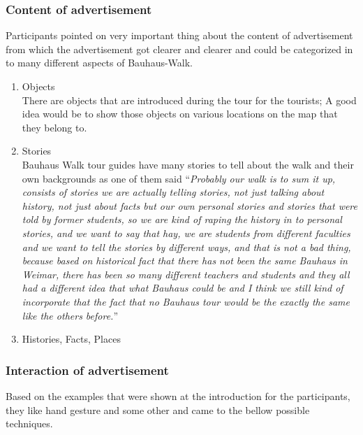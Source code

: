 \subsubsection{Content of advertisement}
Participants pointed on very important thing about the content of advertisement from which the advertisement got clearer and clearer and could be categorized in to many different aspects of Bauhaus-Walk.


\begin {enumerate}

\item	Objects \\
There are objects that are introduced during the tour for the tourists; A good idea would be to show those objects on various locations on the map that they belong to.
\item	Stories \\
Bauhaus Walk tour guides have many stories to tell about the walk and their own backgrounds as one of them said ``\emph{Probably our walk is to sum it up, consists of stories we are actually telling stories, not just talking about history, not just about facts but our own personal stories and stories that were told by former students, so we are kind of raping the history in to personal stories, and we want to say that hay, we are students from different faculties and we want to tell the stories by different ways, and that is not a bad thing, because based on historical fact that there has not been the same Bauhaus in Weimar, there has been so many different teachers and students and they all had a different idea that what Bauhaus could be and I think we still kind of incorporate that the fact that no Bauhaus tour would be the exactly the same like the others before.}''
\item	Histories, Facts, Places

\end{enumerate}

\subsubsection{Interaction of advertisement}
Based on the examples that were shown at the introduction for the participants, they like hand gesture and some other and came to the bellow possible techniques.

